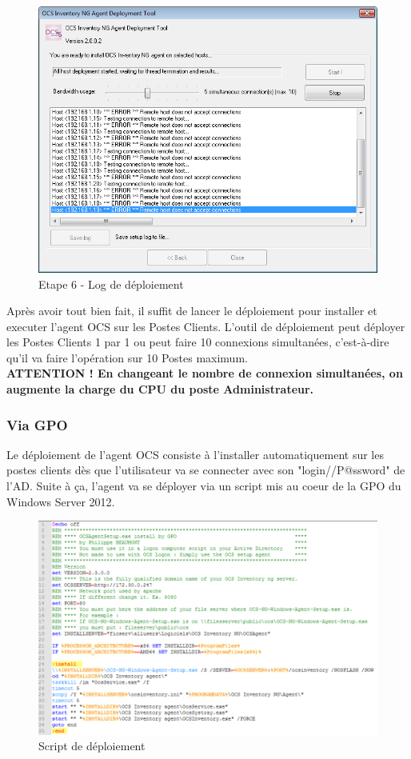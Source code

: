 \documentclass[11pt,a4paper,oneside]{article}
\begin{document}
\begin{figure}[hbtp]
\centering
\includegraphics[scale=0.6]{Script/6.png}
\caption{Etape 6 - Log de déploiement}
\end{figure}

Après avoir tout bien fait, il suffit de lancer le déploiement pour installer et executer l'agent OCS sur les Postes Clients. L'outil de déploiement peut déployer les Postes Clients 1 par 1 ou peut faire 10 connexions simultanées, c'est-à-dire qu'il va faire l'opération sur 10 Postes maximum. \\ 
\textbf{ATTENTION ! En changeant le nombre de connexion simultanées, on augmente la charge du CPU du poste Administrateur.}
\newpage
\subsubsection{Via GPO}
Le déploiement de l'agent OCS consiste à l'installer automatiquement sur les postes clients dès que l'utilisateur va se connecter avec son "login//P@ssword" de l'AD. Suite à ça, l'agent va se déployer via un script mis au coeur de la GPO du Windows Server 2012.
\\
\begin{figure}[hbtp]
\centering
\includegraphics[scale=0.7]{Script/DeploiementGPO1.PNG}
\caption{Script de déploiement}
\end{figure}
\end{document}
